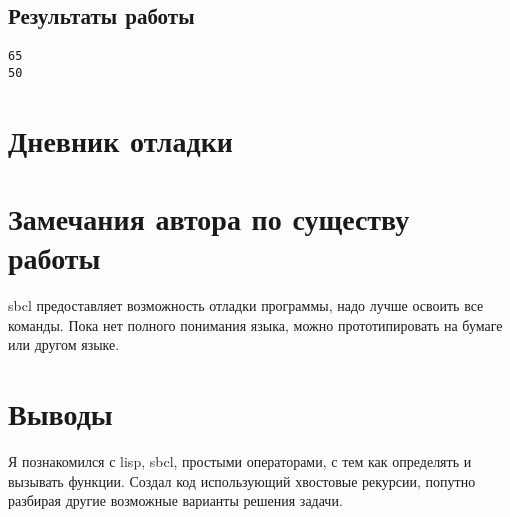 \documentclass[15pt]{extarticle}
\begin{document}
\subsection{Результаты работы}

\begin{lstlisting}
65 
50
\end{lstlisting}

\section{Дневник отладки}


\section{Замечания автора по существу работы}
sbcl предоставляет возможность отладки программы, надо лучше освоить все команды. Пока нет полного понимания языка, можно прототипировать на бумаге или другом языке.

\section{Выводы}
Я познакомился с lisp, sbcl, простыми операторами, с тем как определять и вызывать функции. Создал код использующий хвостовые рекурсии, попутно разбирая другие возможные варианты решения задачи.
\end{document}
